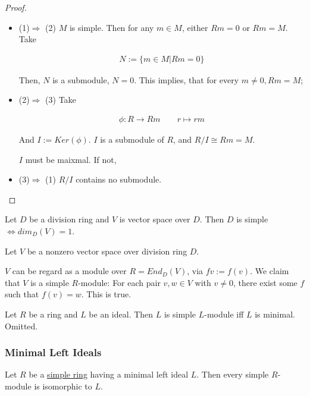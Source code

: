 \documentclass[Total.tex]{subfiles}
\begin{document}
	\begin{proof}
		\begin{itemize}
			\item (1)$\Rightarrow$ (2) $M$ is simple. Then for any $m\in M$, either $Rm=0$ or $Rm=M$. Take
			
			\begin{gather*}
				N:=\{m\in M|Rm=0\}
			\end{gather*}
			
			Then, $N$ is a submodule, $N=0$. This implies, that for every $m\not=0,Rm=M$;
			
			\item (2)$\Rightarrow$ (3) Take
			
			\begin{gather*}
				\phi:R\rightarrow Rm\qquad r\mapsto rm
			\end{gather*}
			
			And $I:=Ker(\phi)$. $I$ is a submodule of $R$, and $R/I\cong Rm=M$.
			
			$I$ must be maixmal. If not, 
			
			\item (3)$\Rightarrow$ (1) $R/I$ contains no submodule.
		\end{itemize}
	\end{proof}
	
	\begin{example}
		Let $D$ be a division ring and $V$ is vector space over $D$. Then $D$ is simple$\Leftrightarrow dim_D(V)=1$.
	\end{example}
	
	\begin{example}
		Let $V$ be a nonzero vector space over division ring $D$. 
		
		$V$ can be regard as a module over $R=End_D(V)$, via $fv:=f(v)$. 	We claim that $V$ is a simple $R$-module: For each pair $v,w\in V$ with $v\not=0$, there exist some $f$ such that $f(v)=w$. This is true. 
	\end{example}
	
	\begin{example}
		Let $R$ be a ring and $L$ be an ideal. Then $L$ is simple $L$-module iff $L$ is minimal. Omitted.
	\end{example}
	
	\subsubsection{Minimal Left Ideals}
	
	\begin{lemma}
		Let $R$ be a \underline{simple ring} having a minimal left ideal $L$. Then every simple $R$-module is isomorphic to $L$.
	\end{lemma}
	
\end{document}
